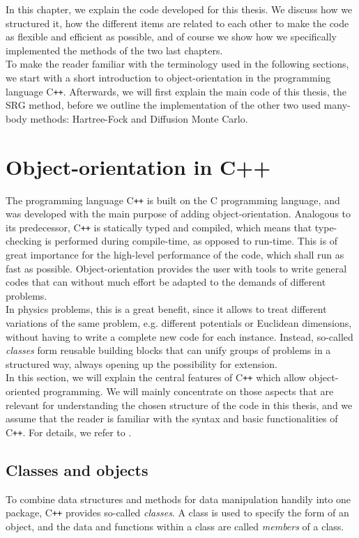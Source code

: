 In this chapter, we explain the code developed for this thesis. We  discuss how we structured it, how the different items are related to each other to make the code as flexible and efficient as possible, and of course we show how we specifically implemented the methods of the two last chapters.\\
To make the reader familiar with the terminology used in the following sections, we start with a short introduction to object-orientation in the programming language C{}\verb!++!. Afterwards, we will first explain the main code of this thesis, the SRG method, before we outline the implementation of the other two used many-body methods: Hartree-Fock and Diffusion Monte Carlo.

\section{Object-orientation in C++}
The programming language C{}\verb!++! is built on the C programming language, and was developed with the main purpose of adding object-orientation. Analogous to its predecessor, C{}\verb!++! is statically typed and compiled, which means that type-checking is performed during compile-time, as opposed to run-time. This is of great importance for the high-level performance of the code, which shall run as fast as possible. Object-orientation  provides the user with tools to write general codes that can without much effort be adapted to the demands of different problems. \\
In physics problems, this is a great benefit, since it allows to treat different variations of the same problem, e.g. different potentials or Euclidean dimensions, without having to write a complete new code for each instance. Instead, so-called \textit{classes} form reusable building blocks that can unify groups of problems in a structured way, always opening up the possibility for extension.\\
In this section, we will explain the central features of C{}\verb!++! which allow object-oriented programming. We will mainly concentrate on those aspects that are relevant for understanding the chosen structure of the code in this thesis, and we assume that the reader 
is familiar with the syntax and basic functionalities of C{}\verb!++!. For  details, we refer to \cite{C++}.

\subsection{Classes and objects}
To combine data structures and methods for data manipulation handily into one package, C{}\verb!++! provides so-called \textit{classes}. A class is used to specify the form of an object, and the data and functions within a class are called \textit{members} of a class.

